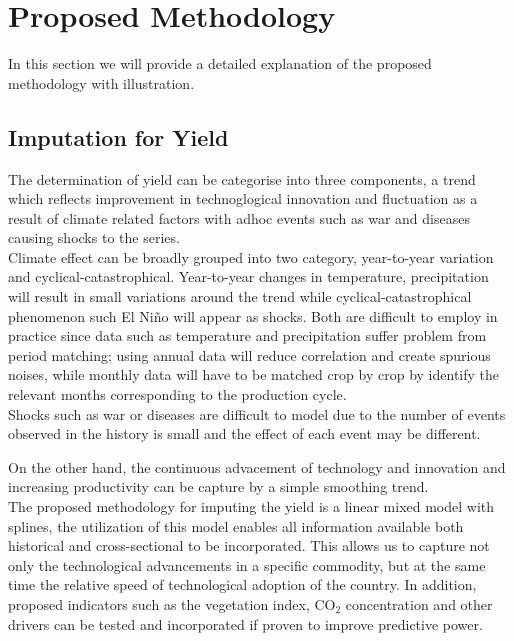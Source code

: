 \documentclass[nojss]{jss}\usepackage[]{graphicx}\usepackage[]{color}
\begin{document}

\FloatBarrier
\section{Proposed Methodology}

In this section we will provide a detailed explanation of the proposed
methodology with illustration.



\subsection{Imputation for Yield}

The determination of yield can be categorise into three components, a
trend which reflects improvement in technoglogical innovation and
fluctuation as a result of climate related factors with adhoc events
such as war and diseases causing shocks to the series. \\


Climate effect can be broadly grouped into two category, year-to-year
variation and cyclical-catastrophical. Year-to-year changes in
temperature, precipitation will result in small variations around the
trend while cyclical-catastrophical phenomenon such El Ni\~{n}o will
appear as shocks. Both are difficult to employ in practice since data
such as temperature and precipitation suffer problem from period
matching; using annual data will reduce correlation and create
spurious noises, while monthly data will have to be matched crop by
crop by identify the relevant months corresponding to the production
cycle. \\

Shocks such as war or diseases are difficult to model due to
the number of events observed in the history is small and the effect
of each event may be different.

On the other hand, the continuous advacement of technology and
innovation and increasing productivity can be capture by a simple
smoothing trend.\\

The proposed methodology for imputing the yield is a linear mixed
model with splines, the utilization of this model enables all
information available both historical and cross-sectional to be
incorporated. This allows us to capture not only the technological
advancements in a specific commodity, but at the same time the
relative speed of technological adoption of the country. In addition,
proposed indicators such as the vegetation index, $\text{CO}_2$
concentration and other drivers can be tested and incorporated if
proven to improve predictive power.\\
\end{document}
